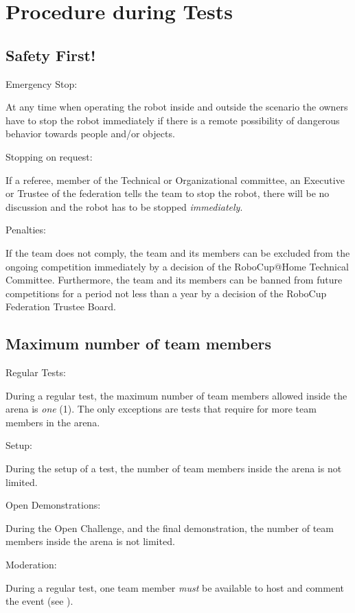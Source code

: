 \section{Procedure during Tests}

\subsection{Safety First!}\label{rule:safetyfirst}
\begin{enumerate}
{\bf\item Emergency Stop:} At any time when operating the robot inside and outside the 
  scenario the owners have to stop the robot immediately if there is a remote possibility 
  of dangerous behavior towards people and/or objects. 
{\bf\item Stopping on request:} If a referee, member of the Technical or Organizational 
  committee, an Executive or Trustee of the federation tells the team to stop the robot, 
  there will be no discussion and the robot has to be stopped \emph{immediately}.
{\bf\item Penalties:} If the team does not comply, the team and its members can be excluded 
  from the ongoing competition immediately by a decision of the RoboCup@Home Technical Committee. 
  Furthermore, the team and its members can be banned from future competitions for a period 
  not less than a year by a decision of the RoboCup Federation Trustee Board.
\end{enumerate}



\subsection{Maximum number of team members}\label{rule:number_of_people}
\begin{enumerate}
  {\bf\item Regular Tests:} During a regular test, the maximum number of team members allowed inside the arena is \emph{one} (1).
    The only exceptions are tests that require for more team members in the arena.
  {\bf\item Setup:} During the setup of a test, 
    the number of team members inside the arena is not limited. 
  {\bf\item Open Demonstrations:} During the Open Challenge, and the final demonstration, 
    the number of team members inside the arena is not limited. 
  {\bf\item Moderation:} During a regular test, one team member \emph{must} be available to host and comment the event (see ).
\end{enumerate}



